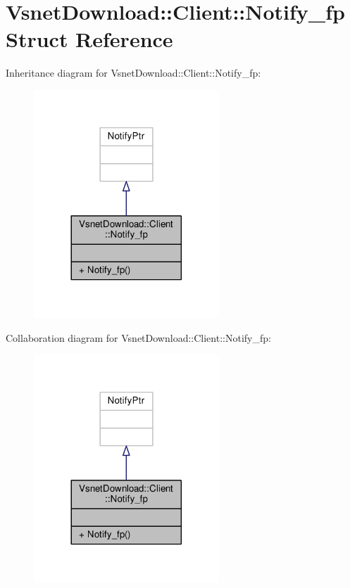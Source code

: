 \hypertarget{structVsnetDownload_1_1Client_1_1Notify__fp}{}\section{Vsnet\+Download\+:\+:Client\+:\+:Notify\+\_\+fp Struct Reference}
\label{structVsnetDownload_1_1Client_1_1Notify__fp}


Inheritance diagram for Vsnet\+Download\+:\+:Client\+:\+:Notify\+\_\+fp\+:
\nopagebreak
\begin{figure}[H]
\begin{center}
\leavevmode
\includegraphics[width=197pt]{d1/d8a/structVsnetDownload_1_1Client_1_1Notify__fp__inherit__graph}
\end{center}
\end{figure}


Collaboration diagram for Vsnet\+Download\+:\+:Client\+:\+:Notify\+\_\+fp\+:
\nopagebreak
\begin{figure}[H]
\begin{center}
\leavevmode
\includegraphics[width=197pt]{dd/d1e/structVsnetDownload_1_1Client_1_1Notify__fp__coll__graph}
\end{center}
\end{figure}
